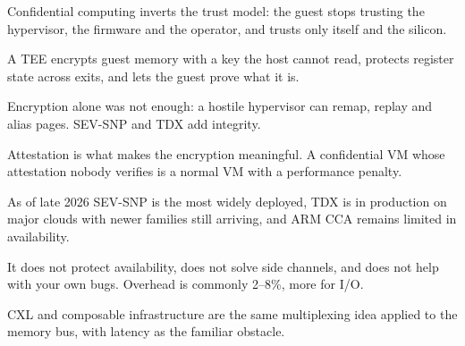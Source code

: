 \begin{chaptersummary}
\begin{tight}
  \item Confidential computing inverts the trust model: the guest stops
        trusting the hypervisor, the firmware and the operator, and trusts only
        itself and the silicon.
  \item A TEE encrypts guest memory with a key the host cannot read, protects
        register state across exits, and lets the guest prove what it is.
  \item Encryption alone was not enough: a hostile hypervisor can remap, replay
        and alias pages. SEV-SNP and TDX add integrity.
  \item Attestation is what makes the encryption meaningful. A confidential VM
        whose attestation nobody verifies is a normal VM with a performance
        penalty.
  \item As of late 2026 SEV-SNP is the most widely deployed, TDX is in
        production on major clouds with newer families still arriving, and ARM
        CCA remains limited in availability.
  \item It does not protect availability, does not solve side channels, and
        does not help with your own bugs. Overhead is commonly 2--8\%, more for
        I/O.
  \item CXL and composable infrastructure are the same multiplexing idea
        applied to the memory bus, with latency as the familiar obstacle.
\end{tight}
\end{chaptersummary}

